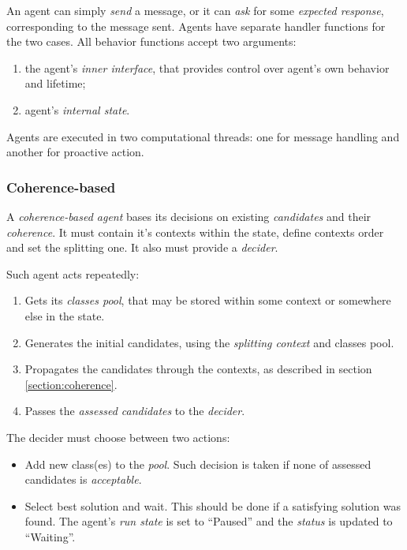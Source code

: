 An agent can simply \emph{send} a message, or it can \emph{ask} for some
\emph{expected response}, corresponding to the message sent. Agents have
separate handler functions for the two cases. All behavior functions
accept two arguments:
\begin{enumerate}
\item the agent's \emph{inner interface}, that provides
  control over agent's own behavior and lifetime;
\item agent's \emph{internal state}.
\end{enumerate}

Agents are executed in two computational threads: one for message handling
and another for proactive action.

\subsubsection{Coherence-based}

A \emph{coherence-based agent} bases its decisions on existing \emph{candidates}
and their \emph{coherence}. It must contain it's contexts within the state,
define contexts order and set the splitting one. It also must provide a
\emph{decider}.
\medskip

\noindent
Such agent acts repeatedly:
\begin{enumerate}
\item Gets its \emph{classes pool}, that may be stored within some context or
  somewhere else in the state.
\item Generates the initial candidates, using the \emph{splitting context} and
  classes pool.
\item Propagates the candidates through the contexts, as described in section
  \ref{section:coherence}.
\item Passes the \emph{assessed candidates} to the \emph{decider}.
\end{enumerate}

The decider must choose between two actions:
\begin{itemize}
\item Add new class(es) to the \emph{pool}. Such decision is taken if
  none of assessed candidates is \emph{acceptable}.
\item Select best solution and wait. This should be done if a satisfying
  solution was found. The agent's \emph{run state} is set to ``Paused'' and
  the \emph{status} is updated to ``Waiting''.
\end{itemize}


